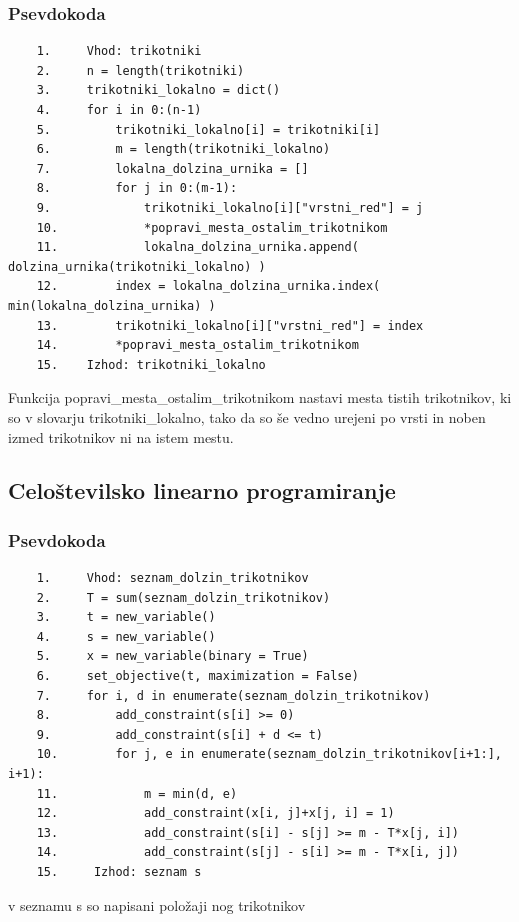 \documentclass[a4paper,12pt]{article}
\theoremstyle{definition}
\theoremstyle{plain}
\begin{document}
\subsubsection{Psevdokoda}
\begin{verbatim}
    1.     Vhod: trikotniki
    2.     n = length(trikotniki)
    3.     trikotniki_lokalno = dict()
    4.     for i in 0:(n-1)
    5.         trikotniki_lokalno[i] = trikotniki[i]
    6.         m = length(trikotniki_lokalno)
    7.         lokalna_dolzina_urnika = []
    8.         for j in 0:(m-1):
    9.             trikotniki_lokalno[i]["vrstni_red"] = j
    10.            *popravi_mesta_ostalim_trikotnikom
    11.            lokalna_dolzina_urnika.append( dolzina_urnika(trikotniki_lokalno) )
    12.        index = lokalna_dolzina_urnika.index( min(lokalna_dolzina_urnika) )
    13.        trikotniki_lokalno[i]["vrstni_red"] = index
    14.        *popravi_mesta_ostalim_trikotnikom
    15.    Izhod: trikotniki_lokalno

\end{verbatim}


Funkcija popravi\_mesta\_ostalim\_trikotnikom nastavi mesta tistih trikotnikov, ki so v slovarju trikotniki\_lokalno, tako da so še vedno urejeni po vrsti in noben izmed trikotnikov ni na istem mestu.


\subsection{Celoštevilsko linearno programiranje}
\subsubsection{Psevdokoda}
\begin{verbatim}
    1.     Vhod: seznam_dolzin_trikotnikov
    2.     T = sum(seznam_dolzin_trikotnikov)
    3.     t = new_variable()
    4.     s = new_variable()
    5.     x = new_variable(binary = True)
    6.     set_objective(t, maximization = False)
    7.     for i, d in enumerate(seznam_dolzin_trikotnikov)
    8.         add_constraint(s[i] >= 0)
    9.         add_constraint(s[i] + d <= t)
    10.        for j, e in enumerate(seznam_dolzin_trikotnikov[i+1:], i+1):
    11.            m = min(d, e)
    12.            add_constraint(x[i, j]+x[j, i] = 1)
    13.            add_constraint(s[i] - s[j] >= m - T*x[j, i])
    14.            add_constraint(s[j] - s[i] >= m - T*x[i, j])
    15.     Izhod: seznam s
\end{verbatim}
v seznamu s so napisani položaji nog trikotnikov
\end{document}
